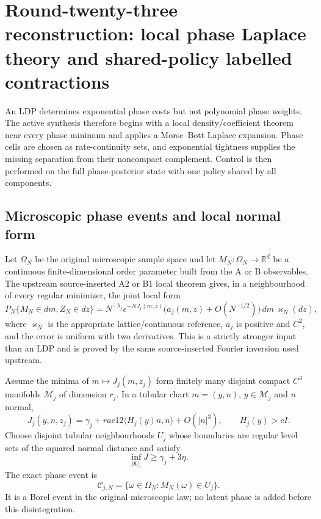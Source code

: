 \section{Round-twenty-three reconstruction: local phase Laplace theory and shared-policy labelled contractions}
\label{sec:r23-d1}

An LDP determines exponential phase costs but not polynomial phase weights.
The active synthesis therefore begins with a local density/coefficient theorem
near every phase minimum and applies a Morse--Bott Laplace expansion.  Phase
cells are chosen as rate-continuity sets, and exponential tightness supplies
the missing separation from their noncompact complement.  Control is then
performed on the full phase-posterior state with one policy shared by all
components.

\subsection{Microscopic phase events and local normal form}

Let $\Omega_N$ be the original microscopic sample space and let
$M_N:\Omega_N\to\mathbb R^d$ be a continuous finite-dimensional order
parameter built from the A or B observables.  The upstream source-inserted A2
or B1 local theorem gives, in a neighbourhood of every regular minimizer, the
joint local form
\[
 P_N\{M_N\in dm,Z_N\in dz\}
 =N^{-\lambda_j}e^{-N J_j(m,z)}
 \bigl(a_j(m,z)+O(N^{-1/2})\bigr)\,dm\,\varkappa_N(dz),   \tag{D1.1}
\]
where $\varkappa_N$ is the appropriate lattice/continuous reference, $a_j$ is
positive and $C^2$, and the error is uniform with two derivatives.  This is a
strictly stronger input than an LDP and is proved by the same source-inserted
Fourier inversion used upstream.

Assume the minima of $m\mapsto J_j(m,z_j)$ form finitely many disjoint compact
$C^3$ manifolds $\mathcal M_j$ of dimension $r_j$.  In a tubular chart
$m=(y,n)$, $y\in\mathcal M_j$ and $n$ normal,
\[
 J_j(y,n,z_j)=\gamma_j+rac12
 \langle H_j(y)n,n\rangle+O(|n|^3),\qquad H_j(y)>cI.      \tag{D1.2}
\]
Choose disjoint tubular neighbourhoods $U_j$ whose boundaries are regular
level sets of the squared normal distance and satisfy
\[
 \inf_{\partial U_j}J\ge\gamma_j+3\eta.                  \tag{D1.3}
\]
The exact phase event is
\[
 \mathcal C_{j,N}=\{\omega\in\Omega_N:M_N(\omega)\in U_j\}.             \tag{D1.4}
\]
It is a Borel event in the original microscopic law; no latent phase is added
before this disintegration.

